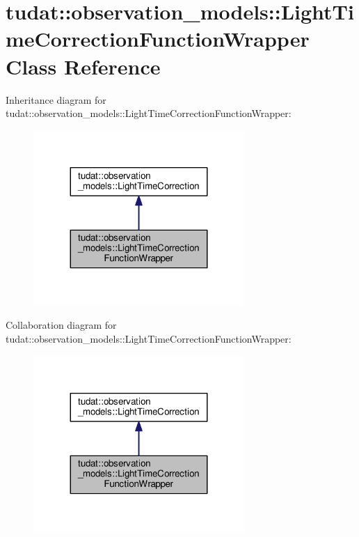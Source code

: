 \hypertarget{classtudat_1_1observation__models_1_1LightTimeCorrectionFunctionWrapper}{}\section{tudat\+:\+:observation\+\_\+models\+:\+:Light\+Time\+Correction\+Function\+Wrapper Class Reference}
\label{classtudat_1_1observation__models_1_1LightTimeCorrectionFunctionWrapper}


Inheritance diagram for tudat\+:\+:observation\+\_\+models\+:\+:Light\+Time\+Correction\+Function\+Wrapper\+:
\nopagebreak
\begin{figure}[H]
\begin{center}
\leavevmode
\includegraphics[width=227pt]{classtudat_1_1observation__models_1_1LightTimeCorrectionFunctionWrapper__inherit__graph}
\end{center}
\end{figure}


Collaboration diagram for tudat\+:\+:observation\+\_\+models\+:\+:Light\+Time\+Correction\+Function\+Wrapper\+:
\nopagebreak
\begin{figure}[H]
\begin{center}
\leavevmode
\includegraphics[width=227pt]{classtudat_1_1observation__models_1_1LightTimeCorrectionFunctionWrapper__coll__graph}
\end{center}
\end{figure}
